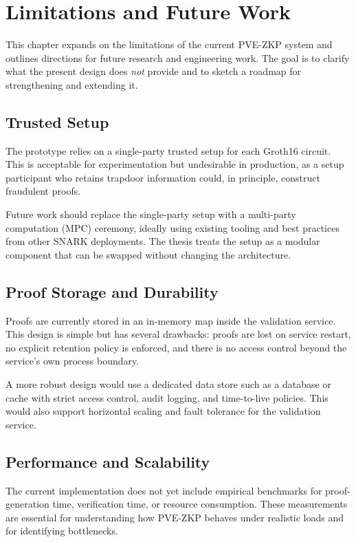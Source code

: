 
\chapter{Limitations and Future Work}

This chapter expands on the limitations of the current PVE-ZKP system and
outlines directions for future research and engineering work. The goal is to
clarify what the present design does \emph{not} provide and to sketch a roadmap
for strengthening and extending it.

\section{Trusted Setup}

The prototype relies on a single-party trusted setup for each Groth16 circuit.
This is acceptable for experimentation but undesirable in production, as a
setup participant who retains trapdoor information could, in principle,
construct fraudulent proofs.

Future work should replace the single-party setup with a multi-party
computation (MPC) ceremony, ideally using existing tooling and best practices
from other SNARK deployments. The thesis treats the setup as a modular
component that can be swapped without changing the architecture.

\section{Proof Storage and Durability}

Proofs are currently stored in an in-memory map inside the validation service.
This design is simple but has several drawbacks: proofs are lost on service
restart, no explicit retention policy is enforced, and there is no access
control beyond the service's own process boundary.

A more robust design would use a dedicated data store such as a database or
cache with strict access control, audit logging, and time-to-live policies.
This would also support horizontal scaling and fault tolerance for the
validation service.

\section{Performance and Scalability}

The current implementation does not yet include empirical benchmarks for
proof-generation time, verification time, or resource consumption. These
measurements are essential for understanding how PVE-ZKP behaves under
realistic loads and for identifying bottlenecks.

